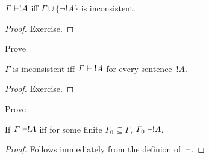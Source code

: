 \documentclass[../../include/open-logic-section]{subfiles}
\begin{document}
\begin{prop} 
$\Gamma \Proves !A$ iff $\Gamma \cup \{\lnot !A\}$ is inconsistent.
\end{prop}

\begin{proof}
Exercise.
\end{proof}

\begin{prob}
Prove 
\end{prob}

\begin{prop}
$\Gamma$ is inconsistent iff $\Gamma \Proves {!A}$ for every
  sentence~$!A$.
\end{prop}

\begin{proof}
Exercise.
\end{proof}

\begin{prob}
Prove 
\end{prob}

\begin{prop}
If $\Gamma \Proves !A$ iff for some finite $\Gamma_0 \subseteq
\Gamma$, $\Gamma_0 \Proves !A$.
\end{prop}

\begin{proof}
Follows immediately from the definion of~$\Proves$.
\end{proof}
\end{document}

